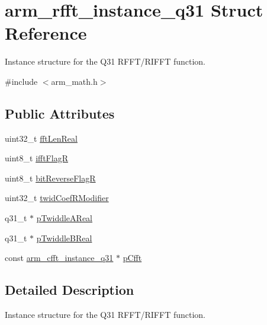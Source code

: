 \hypertarget{structarm__rfft__instance__q31}{\section{arm\-\_\-rfft\-\_\-instance\-\_\-q31 Struct Reference}
\label{structarm__rfft__instance__q31}
}


Instance structure for the Q31 R\-F\-F\-T/\-R\-I\-F\-F\-T function.  




{\ttfamily \#include $<$arm\-\_\-math.\-h$>$}

\subsection*{Public Attributes}
\begin{DoxyCompactItemize}
\item 
uint32\-\_\-t \hyperlink{structarm__rfft__instance__q31_af777b0cadd5abaf064323692c2e6693b}{fft\-Len\-Real}
\item 
uint8\-\_\-t \hyperlink{structarm__rfft__instance__q31_af5c2615e6cde15524df38fa57ea32d94}{ifft\-Flag\-R}
\item 
uint8\-\_\-t \hyperlink{structarm__rfft__instance__q31_a3cb90cdc928a88b0203917dcb3dc1b71}{bit\-Reverse\-Flag\-R}
\item 
uint32\-\_\-t \hyperlink{structarm__rfft__instance__q31_a6fc90252b579f7c29e01bd279334fc43}{twid\-Coef\-R\-Modifier}
\item 
q31\-\_\-t $\ast$ \hyperlink{structarm__rfft__instance__q31_a2a0c944e66bab92fcbe19d1c29153250}{p\-Twiddle\-A\-Real}
\item 
q31\-\_\-t $\ast$ \hyperlink{structarm__rfft__instance__q31_ae5070be4c2e0327e618f5e1f4c5b9d80}{p\-Twiddle\-B\-Real}
\item 
const \hyperlink{structarm__cfft__instance__q31}{arm\-\_\-cfft\-\_\-instance\-\_\-q31} $\ast$ \hyperlink{structarm__rfft__instance__q31_a8fe10d425b59e096c23aa4bb5caa1974}{p\-Cfft}
\end{DoxyCompactItemize}


\subsection{Detailed Description}
Instance structure for the Q31 R\-F\-F\-T/\-R\-I\-F\-F\-T function. 

